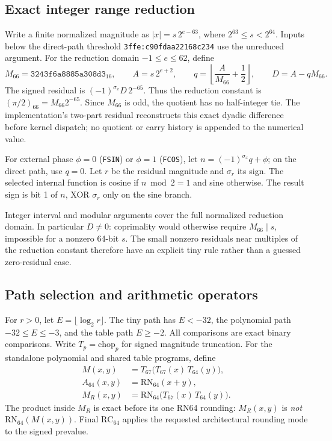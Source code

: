 \documentclass[11pt]{article}
\newcommand{\chop}[1]{\mathrm{chop}_{#1}}   %
\newcommand{\rn}[1]{\mathrm{RN}_{#1}}       %
\newcommand{\instr}[1]{\texttt{#1}}
\newcommand{\hex}[1]{\texttt{#1}}
\begin{document}
\subsection{Exact integer range reduction}
\label{sec:reduction}

Write a finite normalized magnitude as $|x|=s\,2^{e-63}$, where
$2^{63}\le s<2^{64}$. Inputs below the direct-path threshold
\hex{3ffe:c90fdaa22168c234} use the unreduced argument.
For the reduction domain $-1\le e\le62$, define
\[
 M_{66}=\hex{3243f6a8885a308d3}_{16},\qquad
 A=s\,2^{e+2},\qquad
 q=\left\lfloor\frac{A}{M_{66}}+\frac12\right\rfloor,\qquad
 D=A-qM_{66}.
\]
The signed residual is $(-1)^{\sigma_x}D\,2^{-65}$.
Thus the reduction constant is $(\pi/2)_{66}=M_{66}2^{-65}$.
Since $M_{66}$ is odd, the quotient has no half-integer tie.
The implementation's two-part residual reconstructs this exact dyadic
difference before kernel dispatch; no quotient or carry history is appended
to the numerical value.

For external phase $\phi=0$ (\instr{FSIN}) or $\phi=1$ (\instr{FCOS}), let
$n=(-1)^{\sigma_x}q+\phi$; on the direct path, use $q=0$.
Let $r$ be the residual magnitude and $\sigma_r$ its sign.
The selected internal function is cosine if $n\bmod2=1$ and sine otherwise.
The result sign is bit 1 of $n$, XOR $\sigma_r$ only on the sine branch.

Integer interval and modular arguments cover the full normalized reduction
domain. In particular $D\ne0$: coprimality would otherwise require
$M_{66}\mid s$, impossible for a nonzero 64-bit $s$. The small nonzero
residuals near multiples of the reduction constant therefore have an explicit
tiny rule rather than a guessed zero-residual case.

\subsection{Path selection and arithmetic operators}

For $r>0$, let $E=\lfloor\log_2 r\rfloor$.
The tiny path has $E<-32$, the polynomial path $-32\le E\le-3$,
and the table path $E\ge-2$. All comparisons are exact binary comparisons.
Write $T_p=\chop{p}$ for signed magnitude truncation. For the standalone
polynomial and shared table programs, define
\[
 \begin{aligned}
 M(x,y)&=T_{67}\bigl(T_{67}(x)\,T_{64}(y)\bigr),\\
 A_{64}(x,y)&=\rn{64}(x+y),\\
 M_R(x,y)&=\rn{64}\bigl(T_{67}(x)\,T_{64}(y)\bigr).
 \end{aligned}
\]
The product inside $M_R$ is exact before its one RN64 rounding:
$M_R(x,y)$ is \emph{not} $\rn{64}(M(x,y))$.
Final $\mathrm{RC}_{64}$ applies the requested architectural rounding mode
to the signed prevalue.
\end{document}
